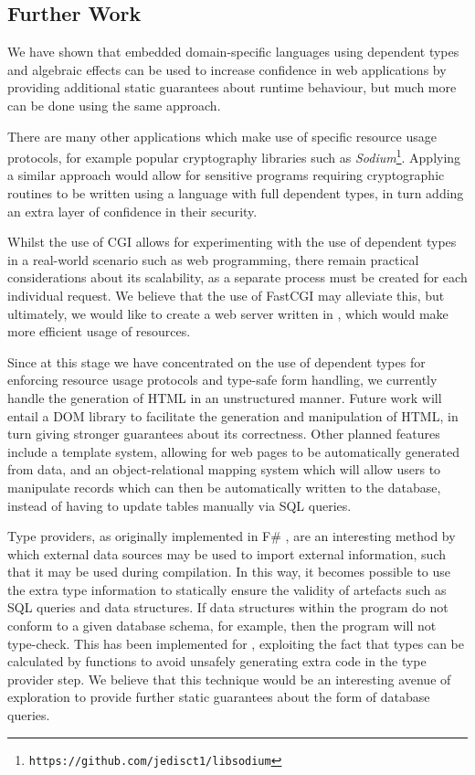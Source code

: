 \subsection{Further Work}

We have shown that embedded domain-specific languages using dependent types and
algebraic effects can be used to increase confidence in web applications by
providing additional static guarantees about runtime behaviour, but much more
can be done using the same approach.

There are many other applications which make use of specific resource usage
protocols, for example popular cryptography libraries such as
\textit{Sodium}\footnote{\texttt{https://github.com/jedisct1/libsodium}}.
Applying a similar approach would allow for sensitive programs requiring
cryptographic routines to be written using a language with full dependent
types, in turn adding an extra layer of confidence in their security. 

Whilst the use of CGI allows for experimenting with the use of dependent types
in a real-world scenario such as web programming, there remain practical
considerations about its scalability, as a separate process must be created for
each individual request. We believe that the use of FastCGI may alleviate this,
but ultimately, we would like to create a web server written in \idris{}, which
would make more efficient usage of resources. 

Since at this stage we have concentrated on the use of dependent types for
enforcing resource usage protocols and type-safe form handling, we currently
handle the generation of HTML in an unstructured manner. Future work will
entail a DOM library to facilitate the generation and manipulation of HTML, in
turn giving stronger guarantees about its correctness. Other planned features
include a template system, allowing for web pages to be automatically generated
from data, and an object-relational mapping system which will allow users to
manipulate records which can then be automatically written to the database,
instead of having to update tables manually via SQL queries.

Type providers, as originally implemented in F\# \cite{msr:tp}, are an
interesting method by which external data sources may be used to import
external information, such that it may be used during compilation. 
In this way, it becomes possible to use the extra type
information to statically ensure the validity of artefacts such as SQL
queries and data structures. If data structures within the program do not
conform to a given database schema, for example, then the program will not
type-check.  This has been implemented for 
\idris{} 
\cite{christiansen:dtp}, exploiting the fact that types can be
calculated by functions to avoid unsafely generating extra code in the type provider
step. We believe that this technique would be an interesting avenue of exploration to provide further static guarantees about the form of database queries.

